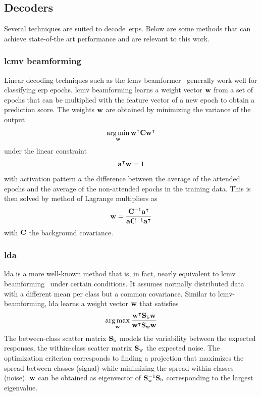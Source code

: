 \subsection{Decoders}
Several techniques are suited to decode~\acp{erp}.
Below are some methods that can achieve state-of-the art performance and are
relevant to this work.

\subsubsection{\Acf{lcmv} beamforming}
Linear decoding techniques such as the \ac{lcmv}
beamformer~\cite{Wittevrongel2016} generally work well for
classifying \ac{erp} epochs.
\Ac{lcmv} beamforming learns a weight vector $\mathbf{w}$ from a set of epochs that can
be multiplied with the feature vector of a new epoch to obtain a prediction
score.
The weights $\mathbf{w}$ are obtained by minimizing the variance of the output
\begin{equation}
  \operatorname*{arg\,min}_{\mathbf{w}}\mathbf{w}^\intercal\mathbf{C}
	\mathbf{w}^\intercal
\end{equation}
under the linear constraint
\begin{equation}
	\mathbf{a}^\intercal\mathbf{w} = 1
\end{equation}
with activation pattern $a$ the difference between the average of the attended epochs and the
average of the non-attended epochs in the training data.
This is then solved by  method of Lagrange multipliers as
\begin{equation}
	\mathbf{w} =
  \frac{\mathbf{C}^{-1}\mathbf{a}^\intercal}
  {\mathbf{a}\mathbf{C}^{-1}\mathbf{a}^\intercal}
\end{equation}
with $\mathbf{C}$ the background covariance.

\subsubsection{\Acf{lda}}
\Ac{lda} is a more well-known method that is, in fact, nearly equivalent to
\ac{lcmv} beamforming~\cite{Treder2016} under certain conditions.
It assumes normally distributed data with a different mean per class but a
common covariance.
Similar to \ac{lcmv}-beamforming, \ac{lda} learns a weight vector $\mathbf{w}$
that satisfies
\begin{equation}
  \operatorname*{arg\,max}_{\mathbf{w}}\frac{\mathbf{w}^\intercal\mathbf{S}_\text{b}\mathbf{w}}{\mathbf{w}^\intercal\mathbf{S}_\text{w}\mathbf{w}}
\end{equation}
The between-class scatter matrix $\mathbf{S}_\text{b}$ models the variability
between the expected responses, the within-class scatter matrix
$\mathbf{S}_\text{w}$ the expected noise.
The optimization criterion corresponds to finding a projection that maximizes
the spread between classes (signal) while minimizing the spread within classes
(noise).
$\mathbf{w}$ can be obtained as eigenvector of
$\mathbf{S}_\text{w}^{-1}\mathbf{S}_\text{b}$ corresponding to the largest eigenvalue.

